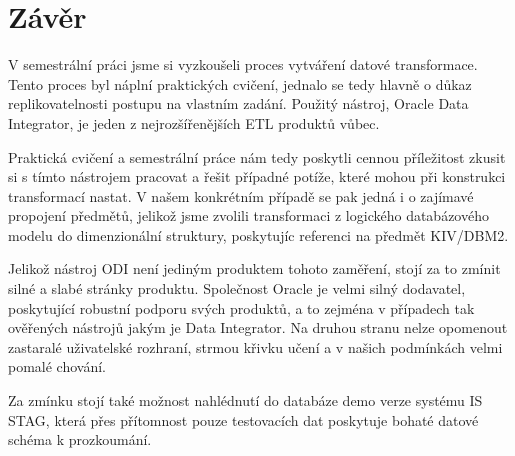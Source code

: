 \section{Závěr}

V semestrální práci jsme si vyzkoušeli proces vytváření datové transformace.
Tento proces byl náplní praktických cvičení, jednalo se tedy hlavně o důkaz replikovatelnosti postupu na vlastním zadání.
Použitý nástroj, Oracle Data Integrator, je jeden z nejrozšířenějších ETL produktů vůbec.

Praktická cvičení a semestrální práce nám tedy poskytli cennou příležitost zkusit si s tímto nástrojem pracovat a řešit případné potíže, které mohou při konstrukci transformací nastat.
V našem konkrétním případě se pak jedná i o zajímavé propojení předmětů, jelikož jsme zvolili transformaci z logického databázového modelu do dimenzionální struktury, poskytujíc referenci na předmět KIV/DBM2.

Jelikož nástroj ODI není jediným produktem tohoto zaměření, stojí za to zmínit silné a slabé stránky produktu.
Společnost Oracle je velmi silný dodavatel, poskytující robustní podporu svých produktů, a to zejména v případech tak ověřených nástrojů jakým je Data Integrator.
Na druhou stranu nelze opomenout zastaralé uživatelské rozhraní, strmou křivku učení a v našich podmínkách velmi pomalé chování.

Za zmínku stojí také možnost nahlédnutí do databáze demo verze systému IS STAG, která přes přítomnost pouze testovacích dat poskytuje bohaté datové schéma k prozkoumání.
